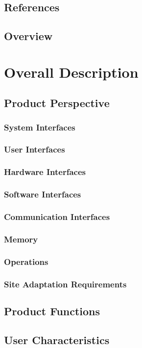 \documentclass[12pt, a4paper]{article}
\begin{document}
	\subsection{References}
	\subsection{Overview}

\section{Overall Description}
	\subsection{Product Perspective}
		\subsubsection{System Interfaces}
		\subsubsection{User Interfaces}
		\subsubsection{Hardware Interfaces}
		\subsubsection{Software Interfaces}
		\subsubsection{Communication Interfaces}
		\subsubsection{Memory}
		\subsubsection{Operations}
		\subsubsection{Site Adaptation Requirements}
	\subsection{Product Functions}
	\subsection{User Characteristics}
\end{document}
